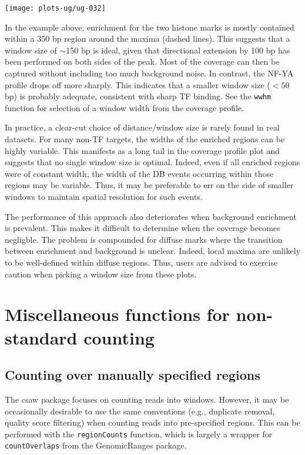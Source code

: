 \documentclass[12pt]{report}
\newcommand{\pkgname}{csaw}
\newcommand{\code}[1]{{\small\texttt{#1}}}
\newcommand{\granges}{GenomicRanges}
\begin{document}
\begin{center}
\texttt{[image: plots-ug/ug-032]}
\end{center}

In the example above, enrichment for the two histone marks is mostly contained within a 350 bp region around the maxima (dashed lines).
This suggests that a window size of $\sim$150 bp is ideal, given that directional extension by 100 bp has been performed on both sides of the peak.
Most of the coverage can then be captured without including too much background noise.
In contrast, the NF-YA profile drops off more sharply.
This indicates that a smaller window size ($< 50$ bp) is probably adequate, consistent with sharp TF binding.
See the \code{wwhm} function for selection of a window width from the coverage profile.

In practice, a clear-cut choice of distance/window size is rarely found in real datasets.
For many non-TF targets, the widths of the enriched regions can be highly variable.
This manifests as a long tail in the coverage profile plot and suggests that no single window size is optimal.
Indeed, even if all enriched regions were of constant width, the width of the DB events occurring within those regions may be variable.
Thus, it may be preferable to err on the side of smaller windows to maintain spatial resolution for such events.

The performance of this approach also deteriorates when background enrichment is prevalent.
This makes it difficult to determine when the coverage becomes negligble.
The problem is compounded for diffuse marks where the transition between enrichment and background is unclear.
Indeed, local maxima are unlikely to be well-defined within diffuse regions.
Thus, users are advised to exercise caution when picking a window size from these plots.

\section{Miscellaneous functions for non-standard counting}

\subsection{Counting over manually specified regions}
The \pkgname{} package focuses on counting reads into windows. 
However, it may be occasionally desirable to use the same conventions (e.g., duplicate removal, quality score filtering) when counting reads into pre-specified regions. 
This can be performed with the \code{regionCounts} function, which is largely a wrapper for \code{countOverlaps} from the \granges{} package.
\end{document}
